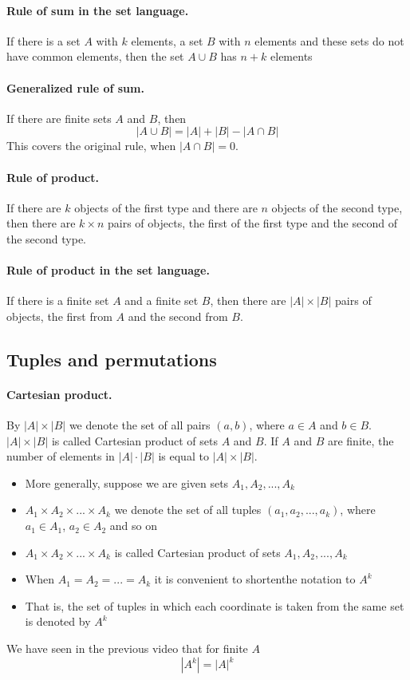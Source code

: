 \documentclass{article}
\begin{document}
\paragraph{Rule of sum in the set language.}
If there is a set $A$ with $k$ elements, a set $B$ with $n$ elements and these sets do not have common elements, then the set $A \cup B$ has $n+k$ elements

\paragraph{Generalized rule of sum.}
If there are finite sets $A$ and $B$, then
\[
|A \cup B| = |A| + |B| - |A \cap B|
\]
This covers the original rule, when $|A \cap B| = 0$.

\paragraph{Rule of product.}
If there are $k$ objects of the first type and there are $n$ objects of the second type, then there are $k \times n$ pairs of objects, the first of the first type and the second of the second type.

\paragraph{Rule of product in the set language.}
If there is a finite set $A$ and a finite set $B$, then there are $|A| \times |B|$ pairs of objects, the first from $A$ and the second from $B$.

\subsection{Tuples and permutations}

\paragraph{Cartesian product.}
By $|A| \times |B|$ we denote the set of all pairs $(a,b)$, where $a \in A$ and $b \in B$. $|A| \times |B|$ is called Cartesian product of sets $A$ and $B$. If $A$ and $B$ are finite, the number of elements in $|A| \cdot |B|$ is equal to $|A| \times |B|$.
\begin{itemize} 
  \item More generally, suppose we are given sets $A_1, A_2, ..., A_k$
  \item $A_1 \times A_2 \times ... \times A_k$ we denote the set of all tuples $(a_1, a_2, ..., a_k)$, where $a_1 \in A_1$, $a_2 \in A_2$ and so on
  \item $A_1 \times A_2 \times ...\times A_k$ is called Cartesian product of sets $A_1, A_2, ..., A_k$
  \item When $A_1 = A_2 = ... = A_k$ it is convenient to shortenthe notation to $A^k$
  \item That is, the set of tuples in which each coordinate is taken from the same set is denoted by $A^k$
\end{itemize}   
We have seen in the previous video that for finite $A$
\[
|A^k| = |A|^k
\]
\end{document}
